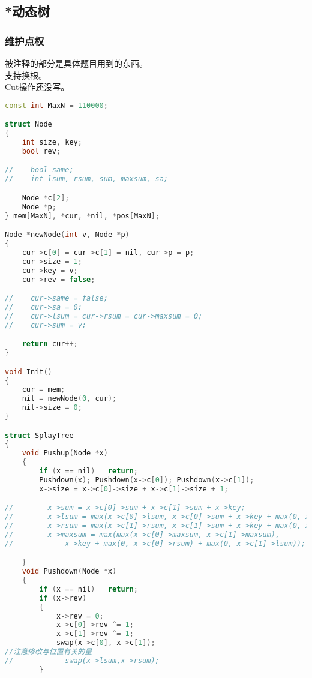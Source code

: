 \subsection{*动态树}
    \subsubsection{维护点权}
        被注释的部分是具体题目用到的东西。\\
        支持换根。\\
        Cut操作还没写。\\
        \begin{lstlisting}[language=c++]
const int MaxN = 110000;

struct Node
{
    int size, key;
    bool rev;

//    bool same;
//    int lsum, rsum, sum, maxsum, sa;

    Node *c[2];
    Node *p;
} mem[MaxN], *cur, *nil, *pos[MaxN];

Node *newNode(int v, Node *p)
{
    cur->c[0] = cur->c[1] = nil, cur->p = p;
    cur->size = 1;
    cur->key = v;
    cur->rev = false;

//    cur->same = false;
//    cur->sa = 0;
//    cur->lsum = cur->rsum = cur->maxsum = 0;
//    cur->sum = v;

    return cur++;
}

void Init()
{
    cur = mem;
    nil = newNode(0, cur);
    nil->size = 0;
}

struct SplayTree
{
    void Pushup(Node *x)
    {
        if (x == nil)   return;
        Pushdown(x); Pushdown(x->c[0]); Pushdown(x->c[1]);
        x->size = x->c[0]->size + x->c[1]->size + 1;

//        x->sum = x->c[0]->sum + x->c[1]->sum + x->key;
//        x->lsum = max(x->c[0]->lsum, x->c[0]->sum + x->key + max(0, x->c[1]->lsum));
//        x->rsum = max(x->c[1]->rsum, x->c[1]->sum + x->key + max(0, x->c[0]->rsum));
//        x->maxsum = max(max(x->c[0]->maxsum, x->c[1]->maxsum),
//            x->key + max(0, x->c[0]->rsum) + max(0, x->c[1]->lsum));

    }
    void Pushdown(Node *x)
    {
        if (x == nil)   return;
        if (x->rev)
        {
            x->rev = 0;
            x->c[0]->rev ^= 1;
            x->c[1]->rev ^= 1;
            swap(x->c[0], x->c[1]);
//注意修改与位置有关的量
//            swap(x->lsum,x->rsum);
        }


\end{lstlisting}
